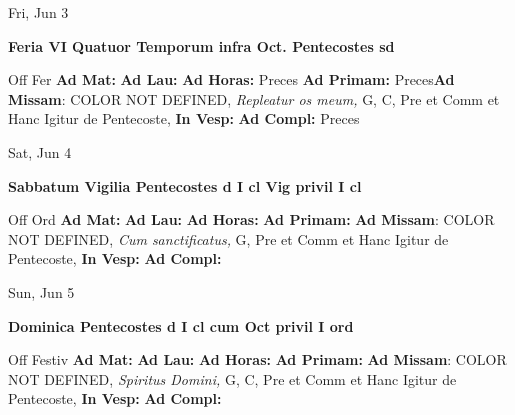 \documentclass[10pt]{book}
\begin{document}
\begin{center}
\begin{minipage}{3.5in}
\vspace{2em}
\begin{center}Fri, Jun 3
\end{center}
\textbf{ \large Feria VI Quatuor Temporum infra Oct. Pentecostes
\textnormal{\normalsize sd}}

\begin{justify}Off Fer
\textbf{Ad Mat: }
\textbf{Ad Lau: }
\textbf{Ad Horas: }Preces
\textbf{Ad Primam: }Preces\textbf{Ad Missam}: COLOR NOT DEFINED, \textit{Repleatur os meum,} G, C, Pre et Comm et Hanc Igitur de Pentecoste, 
\textbf{In Vesp: }
\textbf{Ad Compl: }Preces
\end{justify}
\end{minipage}
\end{center}

\begin{center}
\begin{minipage}{3.5in}
\vspace{2em}
\begin{center}Sat, Jun 4
\end{center}
\textbf{ \large Sabbatum Vigilia Pentecostes
\textnormal{\normalsize d I cl Vig privil I cl}}

\begin{justify}Off Ord
\textbf{Ad Mat: }
\textbf{Ad Lau: }
\textbf{Ad Horas: }
\textbf{Ad Primam: }\textbf{Ad Missam}: COLOR NOT DEFINED, \textit{Cum sanctificatus,} G, Pre et Comm et Hanc Igitur de Pentecoste, 
\textbf{In Vesp: }
\textbf{Ad Compl: }
\end{justify}
\end{minipage}
\end{center}

\begin{center}
\begin{minipage}{3.5in}
\vspace{2em}
\begin{center}Sun, Jun 5
\end{center}
\textbf{ \large Dominica Pentecostes
\textnormal{\normalsize d I cl cum Oct privil I ord}}

\begin{justify}Off Festiv
\textbf{Ad Mat: }
\textbf{Ad Lau: }
\textbf{Ad Horas: }
\textbf{Ad Primam: }\textbf{Ad Missam}: COLOR NOT DEFINED, \textit{Spiritus Domini,} G, C, Pre et Comm et Hanc Igitur de Pentecoste, 
\textbf{In Vesp: }
\textbf{Ad Compl: }
\end{justify}
\end{minipage}
\end{center}
\end{document}
